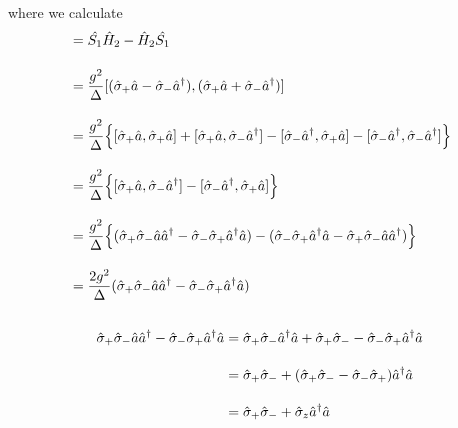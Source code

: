 where we calculate
\begin{align}
    [\hat{S_1}, \hat{H}_2]
    &=\hat{S_1}\hat{H}_2-\hat{H}_2\hat{S_1}\nn[10pt]
    &=\frac{g^2}{\Delta}[(\hsig_+\hat{a}-\hsig_-\hat{a}^\dagger),(\hsig_+\hat{a}+\hsig_-\hat{a}^\dagger)]\nn[10pt]
    &=\frac{g^2}{\Delta}\Bigl\{
    [\hsig_+\hat{a},\hsig_+\hat{a}]
    +[\hsig_+\hat{a},\hsig_-\hat{a}^\dagger]
    -[\hsig_-\hat{a}^\dagger,\hsig_+\hat{a}]
    -[\hsig_-\hat{a}^\dagger,\hsig_-\hat{a}^\dagger]
    \Bigr\}\nn[10pt]
    &=\frac{g^2}{\Delta}\Bigl\{
    [\hsig_+\hat{a},\hsig_-\hat{a}^\dagger]
    -[\hsig_-\hat{a}^\dagger,\hsig_+\hat{a}]
    \Bigr\}\nn[10pt]
    &=\frac{g^2}{\Delta}\Bigl\{
    (\hsig_+\hsig_- \hat{a}\hat{a}^\dagger-\hsig_-\hsig_+\hat{a}^\dagger\hat{a})
    -(
    \hsig_-\hsig_+\hat{a}^\dagger\hat{a}
    -\hsig_+\hsig_-\hat{a}\hat{a}^\dagger
    )
    \Bigr\}\nn[10pt]
    &=\frac{2g^2}{\Delta}(
    \hsig_+\hsig_- \hat{a}\hat{a}^\dagger-\hsig_-\hsig_+\hat{a}^\dagger\hat{a})\nn[10pt]
\end{align}

\begin{align}
    \hsig_+\hsig_- \hat{a}\hat{a}^\dagger-\hsig_-\hsig_+\hat{a}^\dagger\hat{a}
    &= \hsig_+\hsig_-\hat{a}^\dagger\hat{a}
    +\hsig_+\hsig_-
    -\hsig_-\hsig_+\hat{a}^\dagger\hat{a}\nn[10pt]
    &=\hsig_+\hsig_-
    +(\hsig_+\hsig_-
    -\hsig_-\hsig_+)\hat{a}^\dagger\hat{a}\nn[10pt]
    &=\hsig_+\hsig_-
    +\hsig_z\hat{a}^\dagger\hat{a}
\end{align}


